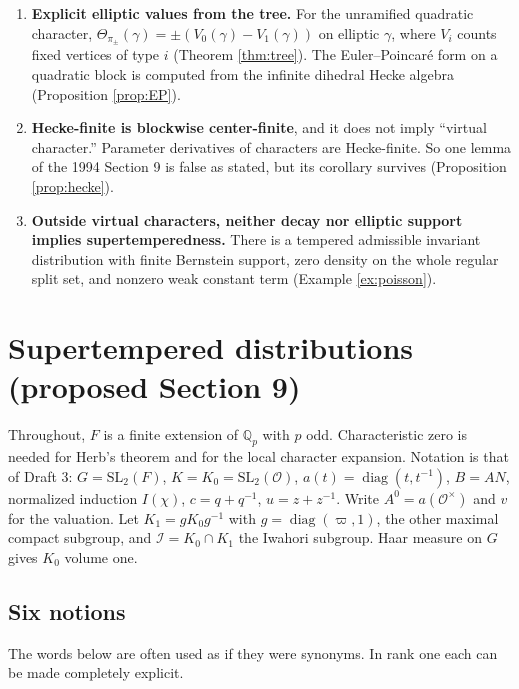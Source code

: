 \documentclass[12pt,letterpaper]{amsart}
\numberwithin{equation}{section}
\theoremstyle{definition}
\theoremstyle{remark}
\begin{document}
\begin{enumerate}[leftmargin=*]
\item \textbf{Explicit elliptic values from the tree.} For the unramified quadratic character, $\Theta_{\pi_\pm}(\gamma)=\pm(V_0(\gamma)-V_1(\gamma))$ on elliptic $\gamma$, where $V_i$ counts fixed vertices of type $i$ (Theorem \ref{thm:tree}). The Euler--Poincar\'e form on a quadratic block is computed from the infinite dihedral Hecke algebra (Proposition \ref{prop:EP}).
\item \textbf{Hecke-finite is blockwise center-finite}, and it does not imply ``virtual character.'' Parameter derivatives of characters are Hecke-finite. So one lemma of the 1994 Section 9 is false as stated, but its corollary survives (Proposition \ref{prop:hecke}).
\item \textbf{Outside virtual characters, neither decay nor elliptic support implies supertemperedness.} There is a tempered admissible invariant distribution with finite Bernstein support, zero density on the whole regular split set, and nonzero weak constant term (Example \ref{ex:poisson}).
\end{enumerate}

\section{Supertempered distributions (proposed Section 9)}
Throughout, $F$ is a finite extension of $\mathbb Q_p$ with $p$ odd. Characteristic zero is needed for Herb's theorem and for the local character expansion. Notation is that of Draft 3: $G=\mathrm{SL}_2(F)$, $K=K_0=\mathrm{SL}_2(\mathcal O)$, $a(t)=\operatorname{diag}(t,t^{-1})$, $B=AN$, normalized induction $I(\chi)$, $c=q+q^{-1}$, $u=z+z^{-1}$. Write $A^0=a(\mathcal O^\times)$ and $v$ for the valuation. Let $K_1=gK_0g^{-1}$ with $g=\operatorname{diag}(\varpi,1)$, the other maximal compact subgroup, and $\mathcal I=K_0\cap K_1$ the Iwahori subgroup. Haar measure on $G$ gives $K_0$ volume one.

\subsection{Six notions}\label{sub:six}
The words below are often used as if they were synonyms. In rank one each can be made completely explicit.
\end{document}
